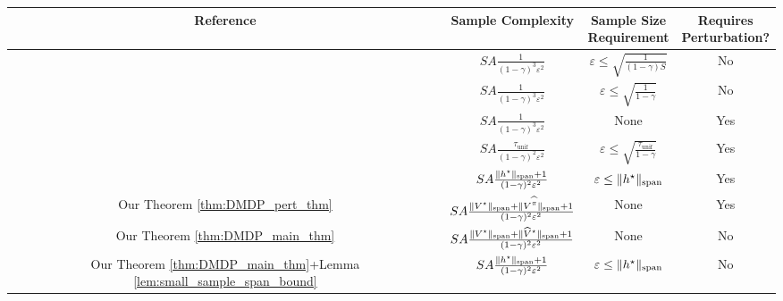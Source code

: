 \documentclass{article}
\theoremstyle{plain}
\theoremstyle{plain}
\theoremstyle{remark}
\theoremstyle{plain}
\theoremstyle{plain}
\newcommand{\Vhat}{\widehat{V}}
\newcommand{\pihat}{\widehat{\pi}}
\newcommand{\Otilde}{\widetilde{O}}
\newcommand{\tmix}{\tau_{\mathrm{unif}}}
\newcommand\cig[1]{\scalerel*[5.5pt]{\Big#1}{%
  \ensurestackMath{\addstackgap[1.5pt]{\big#1}}}}
\newcommand\cigl[1]{\mathopen{\cig{#1}}}
\newcommand\cigr[1]{\mathclose{\cig{#1}}}
\begin{document}
\setlength{\textfloatsep}{20pt plus 1.0pt minus 2.0pt}
\begin{table}[t]
{
\renewcommand{\arraystretch}{1.6} 
\centering
\begin{tabular}{cccc}
\toprule
Reference & Sample Complexity &  \parbox[c]{2.1cm}{Sample Size\\Requirement} &  \parbox[c]{2.1cm}{Requires\\Perturbation?} \\ \midrule
\cite{azar_minimax_2013} & $SA \frac{1}{(1-\gamma)^3\varepsilon^2} $ & $\varepsilon \leq \sqrt{\frac{1}{(1-\gamma)S}}$ & No \\ 
\cite{agarwal_model-based_2020} & $SA \frac{1}{(1-\gamma)^3\varepsilon^2} $ & $\varepsilon \leq \sqrt{\frac{1}{1-\gamma}}$ & No \\ 
\cite{li_breaking_2020} & $SA \frac{1}{(1-\gamma)^3\varepsilon^2} $ & None & Yes \\ 
\cite{wang_optimal_2023} & $SA \frac{\tmix}{(1-\gamma)^2\varepsilon^2} $ & $\varepsilon\leq \sqrt{\frac{\tmix}{1-\gamma}}$  & Yes \\ 
\cite{zurek_span-based_2025} & $SA \frac{\spannorm{h^\star}+1}{(1-\gamma)^2\varepsilon^2} $ & $\varepsilon\leq \spannorm{h^\star}$  & Yes \\ \midrule
Our Theorem \ref{thm:DMDP_pert_thm} & $SA \frac{\spannorm{V^\star} + \spannorm{V^{\pihat}}+1}{(1-\gamma)^2\varepsilon^2} $ & None  & Yes \\ 
Our Theorem \ref{thm:DMDP_main_thm} & $SA \frac{\spannorm{V^\star} + \spannorm{\Vhat^\star}+1}{(1-\gamma)^2\varepsilon^2} $ & None  & No \\ 
Our Theorem \ref{thm:DMDP_main_thm}+Lemma \ref{lem:small_sample_span_bound} &$SA \frac{\spannorm{h^\star}+1}{(1-\gamma)^2\varepsilon^2} $ & $\varepsilon\leq \spannorm{h^\star}$  & No  \\ \bottomrule

\end{tabular}}
\end{table}
\end{document}
